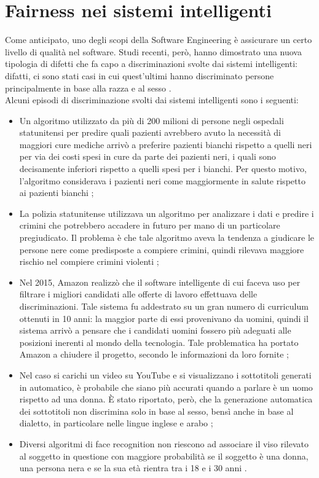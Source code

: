 \section{Fairness nei sistemi intelligenti}
Come anticipato, uno degli scopi della Software Engineering è assicurare un certo livello di qualità nel software. Studi recenti, però, hanno dimostrato una nuova tipologia di difetti che fa capo a discriminazioni svolte dai sistemi intelligenti: difatti, ci sono stati casi in cui quest'ultimi hanno discriminato persone principalmente in base alla razza e al sesso \cite{brun2018software}.\\
Alcuni episodi di discriminazione svolti dai sistemi intelligenti sono i seguenti:
\begin{itemize}
  \item Un algoritmo utilizzato da più di 200 milioni di persone negli ospedali statunitensi per predire quali pazienti avrebbero avuto la necessità di maggiori cure mediche arrivò a preferire pazienti bianchi rispetto a quelli neri per via dei costi spesi in cure da parte dei pazienti neri, i quali sono decisamente inferiori rispetto a quelli spesi per i bianchi. Per questo motivo, l'algoritmo considerava i pazienti neri come maggiormente in salute rispetto ai pazienti bianchi \cite{obermeyer2019dissecting};
  \item La polizia statunitense utilizzava un algoritmo per analizzare i dati e predire i crimini che potrebbero accadere in futuro per mano di un particolare pregiudicato. Il problema è che tale algoritmo aveva la tendenza a giudicare le persone nere come predisposte a compiere crimini, quindi rilevava maggiore rischio nel compiere crimini violenti \cite{biasblack2016propublica};
  \item Nel 2015, Amazon realizzò che il software intelligente di cui faceva uso per filtrare i migliori candidati alle offerte di lavoro effettuava delle discriminazioni. Tale sistema fu addestrato su un gran numero di curriculum ottenuti in 10 anni: la maggior parte di essi provenivano da uomini, quindi il sistema arrivò a pensare che i candidati uomini fossero più adeguati alle posizioni inerenti al mondo della tecnologia. Tale problematica ha portato Amazon a chiudere il progetto, secondo le informazioni da loro fornite \cite{amazonrecruiting2018reuters};
  \item Nel caso si carichi un video su YouTube e si visualizzano i sottotitoli generati in automatico, è probabile che siano più accurati quando a parlare è un uomo rispetto ad una donna. È stato riportato, però, che la generazione automatica dei sottotitoli non discrimina solo in base al sesso, bensì anche in base al dialetto, in particolare nelle lingue inglese e arabo \cite{tatman-2017-gender};
  \item Diversi algoritmi di face recognition non riescono ad associare il viso rilevato al soggetto in questione con maggiore probabilità se il soggetto è una donna, una persona nera e se la sua età rientra tra i 18 e i 30 anni \cite{klare2012face}.
\end{itemize}

